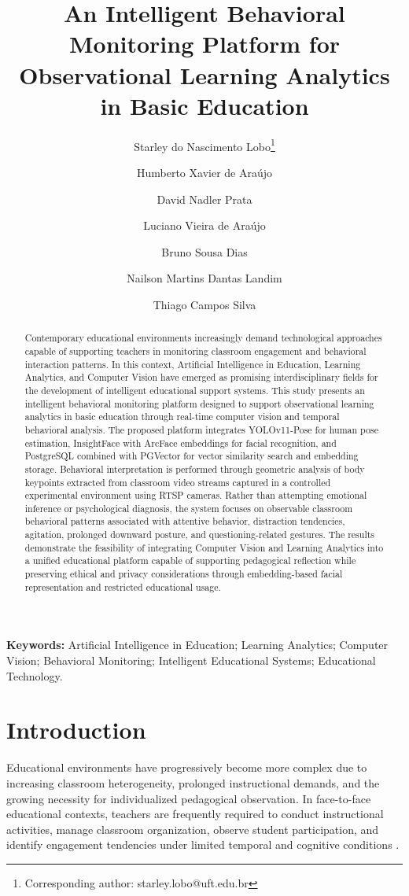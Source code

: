 \documentclass[12pt,a4paper]{article}
\title{An Intelligent Behavioral Monitoring Platform for Observational Learning Analytics in Basic Education}
\author[1]{Starley do Nascimento Lobo\thanks{Corresponding author: starley.lobo@uft.edu.br}}
\author[1]{Humberto Xavier de Araújo }
\author[1]{David Nadler Prata}
\author[1]{Luciano Vieira de Araújo}
\author[1]{Bruno Sousa Dias}
\author[1]{Nailson Martins Dantas Landim}
\author[1]{Thiago Campos Silva}
\affil[1]{Graduate Program in Public Management and Digital Transformation, Federal University of Tocantins, Palmas, Tocantins, Brazil}
\date{}
\begin{document}
\maketitle

\begin{abstract}
Contemporary educational environments increasingly demand technological approaches capable of supporting teachers in monitoring classroom engagement and behavioral interaction patterns. In this context, Artificial Intelligence in Education, Learning Analytics, and Computer Vision have emerged as promising interdisciplinary fields for the development of intelligent educational support systems. This study presents an intelligent behavioral monitoring platform designed to support observational learning analytics in basic education through real-time computer vision and temporal behavioral analysis. The proposed platform integrates YOLOv11-Pose \cite{zhuCsbyoloRapidEfficient2024} for human pose estimation, InsightFace with ArcFace embeddings for facial recognition, and PostgreSQL combined with PGVector for vector similarity search and embedding storage. Behavioral interpretation is performed through geometric analysis of body keypoints extracted from classroom video streams captured in a controlled experimental environment using RTSP cameras. Rather than attempting emotional inference or psychological diagnosis, the system focuses on observable classroom behavioral patterns associated with attentive behavior, distraction tendencies, agitation, prolonged downward posture, and questioning-related gestures. The results demonstrate the feasibility of integrating Computer Vision and Learning Analytics into a unified educational platform capable of supporting pedagogical reflection while preserving ethical and privacy considerations through embedding-based facial representation and restricted educational usage.
\end{abstract}

\noindent\textbf{Keywords:} Artificial Intelligence in Education; Learning Analytics; Computer Vision; Behavioral Monitoring; Intelligent Educational Systems; Educational Technology.

\section{Introduction}

Educational environments have progressively become more complex due to increasing classroom heterogeneity, prolonged instructional demands, and the growing necessity for individualized pedagogical observation. In face-to-face educational contexts, teachers are frequently required to conduct instructional activities, manage classroom organization, observe student participation, and identify engagement tendencies under limited temporal and cognitive conditions \cite{trabelsiRealTimeAttentionMonitoring2023a,yuvarajAutomatedRecognitionTeacher2024,zhangSmartClassroomsHow2024}.
\end{document}
